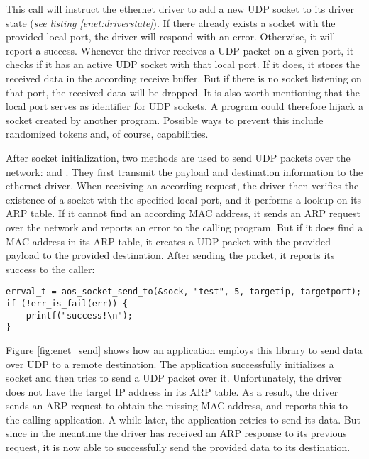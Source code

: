 This call will instruct the ethernet driver to add a new UDP socket to its driver state (\emph{see listing \ref{enet:driverstate}}). If there already exists a socket with the provided local port, the driver will respond with an error. Otherwise, it will report a success. Whenever the driver receives a UDP packet on a given port, it checks if it has an active UDP socket with that local port. If it does, it stores the received data in the according receive buffer. But if there is no socket listening on that port, the received data will be dropped. It is also worth mentioning that the local port serves as identifier for UDP sockets. A program could therefore hijack a socket created by another program. Possible ways to prevent this include randomized tokens and, of course, capabilities.

After socket initialization, two methods are used to send UDP packets over the network:  and . They first transmit the payload and destination information to the ethernet driver. When receiving an according request, the driver then verifies the existence of a socket with the specified local port, and it performs a lookup on its ARP table. If it cannot find an according MAC address, it sends an ARP request over the network and reports an error to the calling program. But if it does find a MAC address in its ARP table, it creates a UDP packet with the provided payload to the provided destination. After sending the packet, it reports its success to the caller:
\begin{mdframed}[style=myframe]
\begin{verbatim}
errval_t = aos_socket_send_to(&sock, "test", 5, targetip, targetport);
if (!err_is_fail(err)) {
    printf("success!\n");
}
\end{verbatim}
\end{mdframed}

Figure \ref{fig:enet_send} shows how an application employs this library to send data over UDP to a remote destination. The application successfully initializes a socket and then tries to send a UDP packet over it. Unfortunately, the driver does not have the target IP address in its ARP table. As a result, the driver sends an ARP request to obtain the missing MAC address, and reports this to the calling application. A while later, the application retries to send its data. But since in the meantime the driver has received an ARP response to its previous request, it is now able to successfully send the provided data to its destination.

